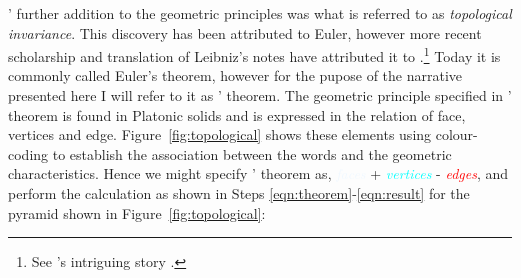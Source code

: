 \documentclass[a4paper, 12pt]{article}
\begin{document}
\citeauthor{descartes_principles_1982}' further addition to the geometric principles was what is referred to as \textit{topological invariance}. This discovery has been attributed to Euler, however more recent scholarship and translation of Leibniz's notes have attributed it to \citeauthor{descartes_principles_1982}.\footnote{See \citeauthor{aczel_descartess_2006}'s intriguing story \citep[pp.~225-228]{aczel_descartess_2006}.} Today it is commonly called Euler's theorem, however for the pupose of the narrative presented here I will refer to it as \citeauthor{descartes_principles_1982}' theorem. The geometric principle specified in \citeauthor{descartes_principles_1982}' theorem is found in Platonic solids and is expressed in the relation of face, vertices and edge. Figure~\ref{fig:topological} shows these elements using colour-coding to establish the association between the words and the geometric characteristics. Hence we might specify \citeauthor{descartes_principles_1982}' theorem as, \textcolor{aliceblue}{\textit{faces}} + \textcolor{cyan}{\textit{vertices}} - \textcolor{red}{\textit{edges}}, and perform the calculation as shown in Steps \ref{eqn:theorem}-\ref{eqn:result} for the pyramid shown in Figure~\ref{fig:topological}:









\end{document}

